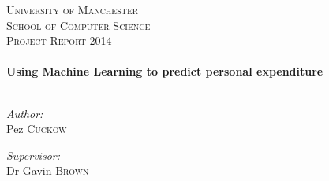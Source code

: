 \begin{titlepage}
\begin{center}

\textsc{\LARGE University of Manchester}\\[1.5cm]
\textsc{\Large School of Computer Science\\Project Report 2014}\\[0.5cm]

\HRule \\[0.4cm]
{ \huge \bfseries Using Machine Learning to predict personal expenditure \\[0.4cm] }
\HRule \\[1.5cm]

\begin{minipage}{0.4\textwidth}
\begin{flushleft} \large
\emph{Author:}\\
Pez \textsc{Cuckow}
\end{flushleft}
\end{minipage}
\begin{minipage}{0.4\textwidth}
\begin{flushright} \large
\emph{Supervisor:} \\
Dr Gavin \textsc{Brown}
\end{flushright}
\end{minipage}

\vfill


\end{center}
\end{titlepage}